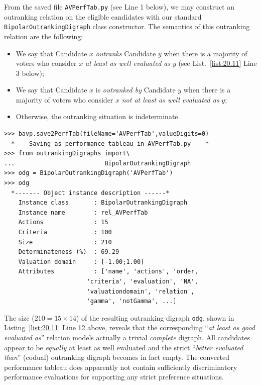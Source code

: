 From the saved file \texttt{AVPerfTab.py} (see Line 1 below), we may construct an outranking relation on the eligible candidates with our standard \texttt{BipolarOutran\-kingDigraph} class constructor. The semantics of this outranking relation are the following:
\begin{itemize}[nosep,leftmargin=0.5cm,rightmargin=0.5cm]
\item We say that Candidate $x$ \emph{outranks} Candidate $y$ when there is a majority of voters who consider $x$ \emph{at least as well evaluated as} $y$ (see List.~\vref{list:20.11} Line 3 below);
\item We say that Candidate $x$ is \emph{outranked by} Candidate $y$ when there is a majority of voters who consider $x$ \emph{not at least as well evaluated as} $y$;
\item Otherwise, the outranking situation is indeterminate.
\end{itemize}
\begin{lstlisting}[caption={Computing the outranking digraph},label=list:20.11]
>>> bavp.save2PerfTab(fileName='AVPerfTab',valueDigits=0)
  *--- Saving as performance tableau in AVPerfTab.py ---*
>>> from outrankingDigraphs import\
...                         BipolarOutrankingDigraph
>>> odg = BipolarOutrankingDigraph('AVPerfTab')
>>> odg
  *------- Object instance description ------*
    Instance class       : BipolarOutrankingDigraph
    Instance name        : rel_AVPerfTab
    Actions              : 15
    Criteria             : 100
    Size                 : 210
    Determinateness (%)  : 69.29
    Valuation domain     : [-1.00;1.00]
    Attributes           : ['name', 'actions', 'order,
                       'criteria', 'evaluation', 'NA',
                       'valuationdomain', 'relation',
                       'gamma', 'notGamma', ...]
\end{lstlisting}

The size ($210 = 15 \times 14$) of the resulting outranking digraph \texttt{odg}, shown in Listing~\vref{list:20.11} Line 12 above, reveals that the corresponding ``\emph{at least as good evaluated as}'' relation models actually a trivial \emph{complete} digraph. All candidates appear to be \emph{equally} at least as well evaluated and the strict ``\emph{better evaluated than}'' (codual) outranking digraph becomes in fact empty. The converted performance tableau does apparently not contain sufficiently discriminatory performance evaluations for supporting any strict preference situations.

